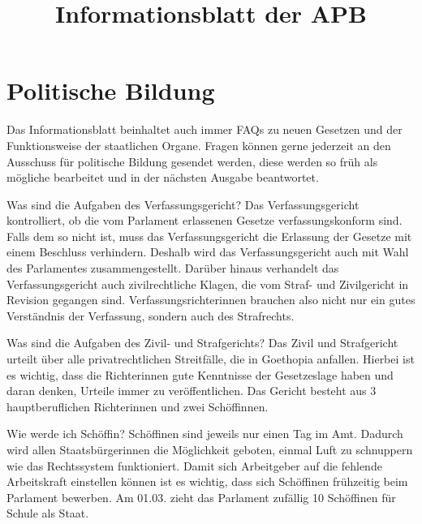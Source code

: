 \documentclass{sasbase}
\begin{document}
\title{Informationsblatt der APB}

\setcounter{secnumdepth}{5}

\mytitle

\parensstyle

\section{Politische Bildung}
Das Informationsblatt beinhaltet auch immer FAQs zu neuen Gesetzen und der Funktionsweise der staatlichen Organe.
Fragen k\"{o}nnen gerne jederzeit an den Ausschuss f\"{u}r politische Bildung gesendet werden, diese werden so fr\"{u}h als m\"{o}gliche bearbeitet und in der n\"{a}chsten Ausgabe beantwortet.

\begin{question}{Was sind die Aufgaben des Verfassungsgericht?}
	Das Verfassungsgericht kontrolliert, ob die vom Parlament erlassenen Gesetze verfassungskonform sind. Falls dem so nicht ist, muss das Verfassungsgericht die Erlassung der Gesetze mit einem Beschluss verhindern. Deshalb wird das Verfassungsgericht auch mit Wahl des Parlamentes zusammengestellt. Dar\"{u}ber hinaus verhandelt das Verfassungsgericht auch zivilrechtliche Klagen, die vom Straf- und Zivilgericht in Revision gegangen sind. Verfassungsrichterinnen brauchen also nicht nur ein gutes Verst\"{a}ndnis der Verfassung, sondern auch des Strafrechts.
\end{question}

\begin{question}{Was sind die Aufgaben des Zivil- und Strafgerichts?}
	Das Zivil und Strafgericht urteilt \"{u}ber alle privatrechtlichen Streitf\"{a}lle, die in Goethopia anfallen. Hierbei ist es wichtig, dass die Richterinnen gute Kenntnisse der Gesetzeslage haben und daran denken, Urteile immer zu ver\"{o}ffentlichen. Das Gericht besteht aus 3 hauptberuflichen Richterinnen und zwei Sch\"{o}ffinnen.
\end{question}

\begin{question}{Wie werde ich Sch\"{o}ffin?}
	Sch\"{o}ffinen sind jeweils nur einen Tag im Amt. Dadurch wird allen Staatsb\"{u}rgerinnen die M\"{o}glichkeit geboten, einmal Luft zu schnuppern wie das Rechtssystem funktioniert. Damit sich Arbeitgeber auf die fehlende Arbeitskraft einstellen k\"{o}nnen ist es wichtig, dass sich Sch\"{o}ffinen fr\"{u}hzeitig beim Parlament bewerben. Am 01.03. zieht das Parlament zuf\"{a}llig 10 Sch\"{o}ffinen f\"{u}r Schule als Staat.
\end{question}
\end{document}
